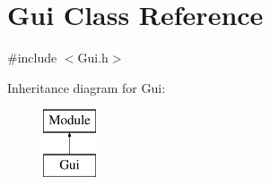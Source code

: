 \hypertarget{class_gui}{}\section{Gui Class Reference}
\label{class_gui}


{\ttfamily \#include $<$Gui.\+h$>$}

Inheritance diagram for Gui\+:\begin{figure}[H]
\begin{center}
\leavevmode
\includegraphics[height=2.000000cm]{class_gui}
\end{center}
\end{figure}
